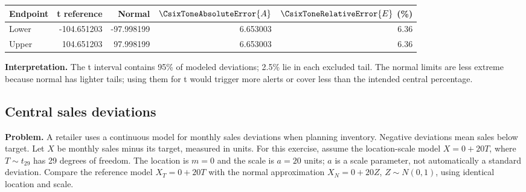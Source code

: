 \begin{center}\begin{tabular}{lrrrr}\toprule Endpoint & t reference & Normal & $\CsixToneAbsoluteError{A}$ & $\CsixToneRelativeError{E}$ (\%)\\\midrule
Lower&-104.651203&-97.998199&6.653003&6.36\\
Upper&104.651203&97.998199&6.653003&6.36\\
\bottomrule\end{tabular}\end{center}
\textbf{Interpretation.} The t interval contains 95\% of modeled deviations; 2.5\% lie in each excluded tail. The normal limits are less extreme because normal has lighter tails; using them for t would trigger more alerts or cover less than the intended central percentage.


\clearpage
\subsection{Central sales deviations}
\label{c9-i4}
\textbf{Problem.} A retailer uses a continuous model for monthly sales deviations when planning inventory. Negative deviations mean sales below target. Let $X$ be monthly sales minus its target, measured in units. For this exercise, assume the location-scale model $X=0+20T$, where $T\sim t_{29}$ has 29 degrees of freedom. The location is $m=0$ and the scale is $a=20$ units; $a$ is a scale parameter, not automatically a standard deviation. Compare the reference model $X_T=0+20T$ with the normal approximation $X_N=0+20Z$, $Z\sim N(0,1)$, using identical location and scale.

